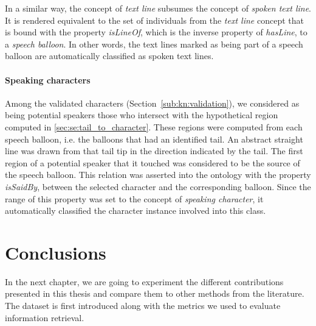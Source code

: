 In a similar way, the concept of \textit{text line} subsumes the concept of \textit{spoken text line}.
It is rendered equivalent to the set of individuals from the \textit{text line} concept that is bound with the property \textit{isLineOf}, which is the inverse property of \textit{hasLine}, to a \textit{speech balloon}.
In other words, the text lines marked as being part of a speech balloon are automatically classified as spoken text lines.


\paragraph{Speaking characters} %
\label{sub:inference_of_the_speaking_characters}
Among the validated characters (Section~\ref{sub:kn:validation}), we considered as being potential speakers those who intersect with the hypothetical region computed in \ref{sec:se:tail_to_character}.
These regions were computed from each speech balloon, i.e. the balloons that had an identified tail.
An abstract straight line was drawn from that tail tip in the direction indicated by the tail.
The first region of a potential speaker that it touched was considered to be the source of the speech balloon.
This relation was asserted into the ontology with the property \textit{isSaidBy}, between the selected character and the corresponding balloon.
Since the range of this property was set to the concept of \textit{speaking character}, it automatically classified the character instance involved into this class.



\section{Conclusions}
\label{sec:kn:conclusion}


In the next chapter, we are going to experiment the different contributions presented in this thesis and compare them to other methods from the literature.
The dataset is first introduced along with the metrics we used to evaluate information retrieval. 

